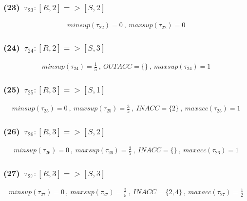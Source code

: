 \documentclass[a4paper,12pt]{jarticle}
\begin{document}
\subsubsection*{(23)~$\tau_{23}:[R,2]=>[S,2]$}
\vspace{-4mm}
%
\begin{align*}
 minsup(\tau_{22})=0~,~maxsup(\tau_{22})=0
\end{align*}
%
\vspace{-10mm}
\subsubsection*{(24)~$\tau_{24}:[R,2]=>[S,3]$}
\vspace{-4mm}
%
\begin{align*}
 minsup(\tau_{24})=\frac{1}{5}~,~OUTACC=\{\}~,~maxsup(\tau_{24})=1
\end{align*}
%
\vspace{-10mm}
\subsubsection*{(25)~$\tau_{25}:[R,3]=>[S,1]$}
\vspace{-4mm}
%
\begin{align*}
 minsup(\tau_{25})=0~,~maxsup(\tau_{25})=\frac{3}{5}~,~INACC=\{2\}~,~maxacc(\tau_{25})=1
\end{align*}
%
\vspace{-10mm}
\subsubsection*{(26)~$\tau_{26}:[R,3]=>[S,2]$}
\vspace{-4mm}
%
\begin{align*}
 minsup(\tau_{26})=0~,~maxsup(\tau_{26})=\frac{2}{5}~,~INACC=\{\}~,~maxacc(\tau_{26})=1
\end{align*}
%
\vspace{-10mm}
\subsubsection*{(27)~$\tau_{27}:[R,3]=>[S,3]$}
\vspace{-4mm}
%
\begin{align*}
 minsup(\tau_{27})=0~,~maxsup(\tau_{27})=\frac{2}{5}~,~INACC=\{2,4\}~,~maxacc(\tau_{27})=\frac{1}{2}
\end{align*}
%
\end{document}
